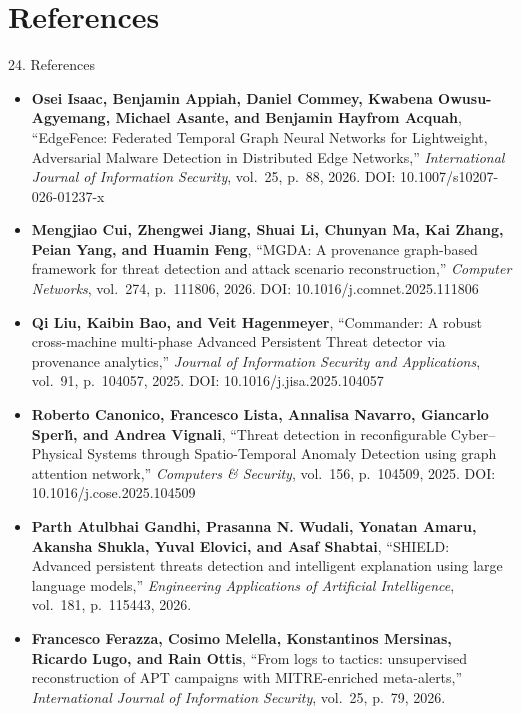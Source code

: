 \documentclass[aspectratio=169,10pt]{beamer}
\begin{document}
\section{References}

\begin{frame}[t]{24. References}
\vspace{-0.2em}
\fontsize{6.2pt}{8.0pt}\selectfont
\begin{itemize}\itemsep0.15em
  \item[\textbf{[1]}] \textbf{Osei Isaac, Benjamin Appiah, Daniel Commey, Kwabena Owusu-Agyemang, Michael Asante, and Benjamin Hayfrom Acquah}, ``EdgeFence: Federated Temporal Graph Neural Networks for Lightweight, Adversarial Malware Detection in Distributed Edge Networks,'' \textit{International Journal of Information Security}, vol.~25, p.~88, 2026. DOI: 10.1007/s10207-026-01237-x
  \item[\textbf{[2]}] \textbf{Mengjiao Cui, Zhengwei Jiang, Shuai Li, Chunyan Ma, Kai Zhang, Peian Yang, and Huamin Feng}, ``MGDA: A provenance graph-based framework for threat detection and attack scenario reconstruction,'' \textit{Computer Networks}, vol.~274, p.~111806, 2026. DOI: 10.1016/j.comnet.2025.111806
  \item[\textbf{[3]}] \textbf{Qi Liu, Kaibin Bao, and Veit Hagenmeyer}, ``Commander: A robust cross-machine multi-phase Advanced Persistent Threat detector via provenance analytics,'' \textit{Journal of Information Security and Applications}, vol.~91, p.~104057, 2025. DOI: 10.1016/j.jisa.2025.104057
  \item[\textbf{[4]}] \textbf{Roberto Canonico, Francesco Lista, Annalisa Navarro, Giancarlo Sperl{\'\i}, and Andrea Vignali}, ``Threat detection in reconfigurable Cyber--Physical Systems through Spatio-Temporal Anomaly Detection using graph attention network,'' \textit{Computers \& Security}, vol.~156, p.~104509, 2025. DOI: 10.1016/j.cose.2025.104509
  \item[\textbf{[5]}] \textbf{Parth Atulbhai Gandhi, Prasanna N. Wudali, Yonatan Amaru, Akansha Shukla, Yuval Elovici, and Asaf Shabtai}, ``SHIELD: Advanced persistent threats detection and intelligent explanation using large language models,'' \textit{Engineering Applications of Artificial Intelligence}, vol.~181, p.~115443, 2026.
  \item[\textbf{[6]}] \textbf{Francesco Ferazza, Cosimo Melella, Konstantinos Mersinas, Ricardo Lugo, and Rain Ottis}, ``From logs to tactics: unsupervised reconstruction of APT campaigns with MITRE-enriched meta-alerts,'' \textit{International Journal of Information Security}, vol.~25, p.~79, 2026.

\end{itemize}
\end{frame}
\end{document}
